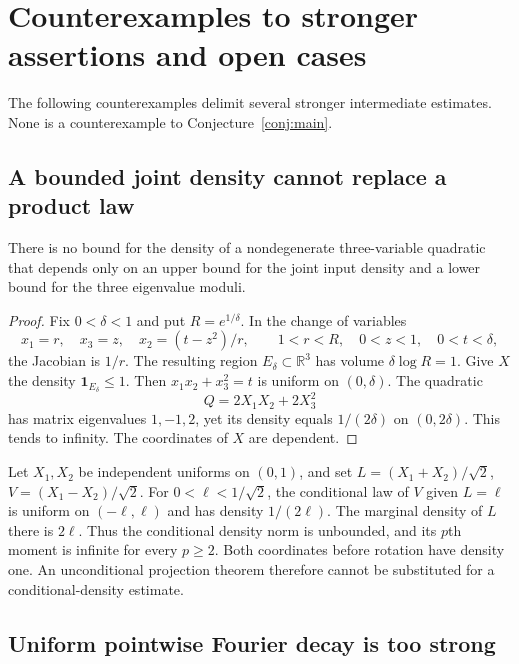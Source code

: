 \section{Counterexamples to stronger assertions and open cases}\label{sec:limitations}

The following counterexamples delimit several stronger intermediate estimates. None is a counterexample to Conjecture~\ref{conj:main}.

\subsection{A bounded joint density cannot replace a product law}

\begin{proposition}\label{lim:shell}
There is no bound for the density of a nondegenerate three-variable quadratic that depends only on an upper bound for the joint input density and a lower bound for the three eigenvalue moduli.
\end{proposition}
\begin{proof}
Fix $0<\delta<1$ and put $R=e^{1/\delta}$. In the change of variables
\[
 x_1=r,\quad x_3=z,\quad x_2=(t-z^2)/r,
 \qquad 1<r<R,\quad0<z<1,\quad0<t<\delta,
\]
the Jacobian is $1/r$. The resulting region $E_\delta\subset\mathbb R^3$ has volume $\delta\log R=1$. Give $X$ the density $\mathbf1_{E_\delta}\le1$. Then $x_1x_2+x_3^2=t$ is uniform on $(0,\delta)$. The quadratic
\[
 Q=2X_1X_2+2X_3^2
\]
has matrix eigenvalues $1,-1,2$, yet its density equals $1/(2\delta)$ on $(0,2\delta)$. This tends to infinity. The coordinates of $X$ are dependent.
\end{proof}

\begin{example}\label{lim:conditional}
Let $X_1,X_2$ be independent uniforms on $(0,1)$, and set $L=(X_1+X_2)/\sqrt2$, $V=(X_1-X_2)/\sqrt2$. For $0<\ell<1/\sqrt2$, the conditional law of $V$ given $L=\ell$ is uniform on $(-\ell,\ell)$ and has density $1/(2\ell)$. The marginal density of $L$ there is $2\ell$. Thus the conditional density norm is unbounded, and its $p$th moment is infinite for every $p\ge2$. Both coordinates before rotation have density one. An unconditional projection theorem therefore cannot be substituted for a conditional-density estimate.
\end{example}

\subsection{Uniform pointwise Fourier decay is too strong}


